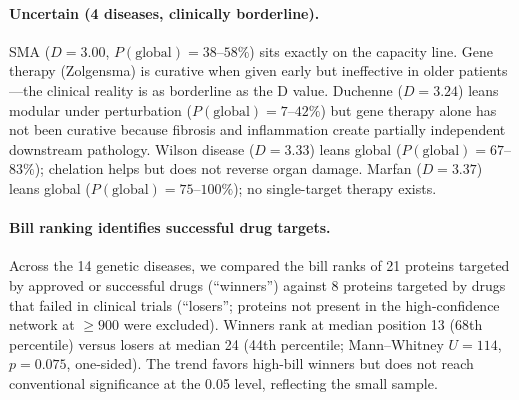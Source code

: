 \documentclass[11pt,a4paper]{article}
\begin{document}
\paragraph{Uncertain (4 diseases, clinically borderline).}
SMA ($D = 3.00$, $P(\text{global}) = 38$--$58\%$) sits exactly on the capacity line. Gene therapy (Zolgensma) is curative when given early but ineffective in older patients---the clinical reality is as borderline as the D value. Duchenne ($D = 3.24$) leans modular under perturbation ($P(\text{global}) = 7$--$42\%$) but gene therapy alone has not been curative because fibrosis and inflammation create partially independent downstream pathology. Wilson disease ($D = 3.33$) leans global ($P(\text{global}) = 67$--$83\%$); chelation helps but does not reverse organ damage. Marfan ($D = 3.37$) leans global ($P(\text{global}) = 75$--$100\%$); no single-target therapy exists.

\paragraph{Bill ranking identifies successful drug targets.}
Across the 14 genetic diseases, we compared the bill ranks of 21 proteins targeted by approved or successful drugs (``winners'') against 8 proteins targeted by drugs that failed in clinical trials (``losers''; proteins not present in the high-confidence network at $\geq 900$ were excluded). Winners rank at median position 13 (68th percentile) versus losers at median 24 (44th percentile; Mann--Whitney $U = 114$, $p = 0.075$, one-sided). The trend favors high-bill winners but does not reach conventional significance at the 0.05 level, reflecting the small sample.
\end{document}
